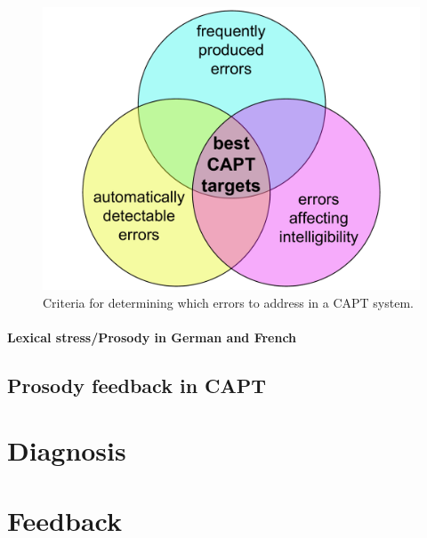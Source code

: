 \begin{figure}[htb]
	\includegraphics[width=\textwidth]{../img/error-venn}
	\caption{Criteria for determining which errors to address in a CAPT system.}
	\label{fig:errors}
\end{figure}

\paragraph{Lexical stress/Prosody in German and French}
\blindtext

\subsection{Prosody feedback in CAPT}
\blindtext

\section{Diagnosis}
\blindtext

\section{Feedback}
\blindtext

